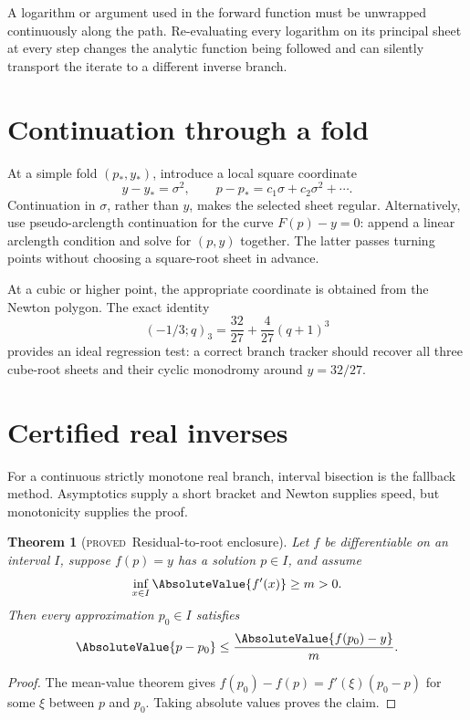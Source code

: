 \documentclass[11pt,letterpaper,oneside,openany]{book}
\newtheorem{theorem}{Theorem}[chapter]
\theoremstyle{definition}
\theoremstyle{remark}
\newcommand{\statusproved}{\textcolor{provedgreen}{\textsc{proved}}}
\begin{document}
A logarithm or argument used in the forward function must be unwrapped
continuously along the path.  Re-evaluating every logarithm on its principal
sheet at every step changes the analytic function being followed and can
silently transport the iterate to a different inverse branch.

\section{Continuation through a fold}
At a simple fold \((p_*,y_*)\), introduce a local square coordinate
\[
 y-y_*=\sigma^2,
 \qquad
 p-p_*=c_1\sigma+c_2\sigma^2+\cdots.
\]
Continuation in \(\sigma\), rather than \(y\), makes the selected sheet
regular.  Alternatively, use pseudo-arclength continuation for the curve
\(F(p)-y=0\): append a linear arclength condition and solve for \((p,y)\)
together.  The latter passes turning points without choosing a square-root
sheet in advance.

At a cubic or higher point, the appropriate coordinate is obtained from the
Newton polygon.  The exact identity
\[
 (-1/3;q)_3=\frac{32}{27}+\frac4{27}(q+1)^3
\]
provides an ideal regression test: a correct branch tracker should recover all
three cube-root sheets and their cyclic monodromy around \(y=32/27\).

\section{Certified real inverses}
For a continuous strictly monotone real branch, interval bisection is the
fallback method.  Asymptotics supply a short bracket and Newton supplies speed,
but monotonicity supplies the proof.

\begin{theorem}[\statusproved\ Residual-to-root enclosure]\label{thm:residual-root}
Let \(f\) be differentiable on an interval \(I\), suppose \(f(p)=y\) has a
solution \(p\in I\), and assume
\[
 \inf_{x\in I}\AbsoluteValue{f'(x)}\ge m>0.
\]
Then every approximation \(p_0\in I\) satisfies
\begin{equation}\label{eq:residual-root-bound}
 \AbsoluteValue{p-p_0}\le\frac{\AbsoluteValue{f(p_0)-y}}m.
\end{equation}
\end{theorem}
\begin{proof}
The mean-value theorem gives
\(f(p_0)-f(p)=f'(\xi)(p_0-p)\) for some \(\xi\) between \(p\) and \(p_0\).
Taking absolute values proves the claim.
\end{proof}
\end{document}
